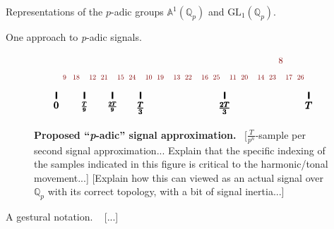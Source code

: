 \documentclass[letterpaper,11pt, reqno]{amsart}
\newtheorem{monodromy theorem}{Monodromy Theorem}[subsection]
\newtheorem{wild conjecture}[theorem]{Wild Conjecture}
\newtheorem{research objectives}{Research objectives}[subsection]
\newtheorem{research question}[theorem]{Research questions}
\newtheorem{aside question}[theorem]{Aside question}
\newtheorem{audio example}[theorem]{\loudspeaker[3] Example}
\newtheorem{blank remark}[theorem]{}
\newtheorem{terminology and comment}[theorem]{Terminology and comment}
\newtheorem{purity hypothesis}[theorem]{Purity hypothesis}
\newtheorem{corollary of the purity hypothesis}[theorem]{Corollary of the purity hypothesis}
\newcommand{\QQ} {{\mathbb Q}}
\numberwithin{equation}{theorem}
\begin{document}
\begin{section}{Representations of the $p$-adic groups $\mathbb{A}^{\!1}(\mathbb{Q}_{p})$ and $\text{GL}_{1}(\mathbb{Q}_{p})$.}
\begin{subsection}{One approach to {\em p}-adic signals.}
\begin{figure}[ht]
$$\begin{tikzpicture}
	\node[red!50!black!100] at (8,1.25) {\scalebox{.9}{$8$}};
	\node[red!50!black!100] at (1/3,.65) {\scalebox{.7}{$9\ $}};
	\node[red!50!black!100] at (2/3,.65) {\scalebox{.7}{$\ 18$}};
	\node[red!50!black!100] at (1+1/3,.65) {\scalebox{.7}{$12\ $}};
	\node[red!50!black!100] at (1+2/3,.65) {\scalebox{.7}{$\ 21$}};
	\node[red!50!black!100] at (2+1/3,.65) {\scalebox{.7}{$15\ $}};
	\node[red!50!black!100] at (2+2/3,.65) {\scalebox{.7}{$\ 24$}};
	\node[red!50!black!100] at (3+1/3,.65) {\scalebox{.7}{$10\ $}};
	\node[red!50!black!100] at (3+2/3,.65) {\scalebox{.7}{$\ 19$}};
	\node[red!50!black!100] at (4+1/3,.65) {\scalebox{.7}{$13\ $}};
	\node[red!50!black!100] at (4+2/3,.65) {\scalebox{.7}{$\ 22$}};
	\node[red!50!black!100] at (5+1/3,.65) {\scalebox{.7}{$16\ $}};
	\node[red!50!black!100] at (5+2/3,.65) {\scalebox{.7}{$\ 25$}};
	\node[red!50!black!100] at (6+1/3,.65) {\scalebox{.7}{$11\ $}};
	\node[red!50!black!100] at (6+2/3,.65) {\scalebox{.7}{$\ 20$}};
	\node[red!50!black!100] at (7+1/3,.65) {\scalebox{.7}{$14\ $}};
	\node[red!50!black!100] at (7+2/3,.65) {\scalebox{.7}{$\ 23$}};
	\node[red!50!black!100] at (8+1/3,.65) {\scalebox{.7}{$17\ $}};
	\node[red!50!black!100] at (8+2/3,.65) {\scalebox{.7}{$\ 26$}};
	\draw[black, ultra thick] (0,.125) -- (0,-.125);
	\draw[black, ultra thick] (1,.125) -- (1,-.125);
	\draw[black, ultra thick] (2,.125) -- (2,-.125);
	\draw[black, ultra thick] (3,.125) -- (3,-.125);
	\draw[black, ultra thick] (6,.125) -- (6,-.125);
	\draw[black, ultra thick] (9,.125) -- (9,-.125);
	\node[black] at (0,-.35) {\scalebox{1}{$\pmb{0}$}};
	\node[black] at (1,-.4) {\scalebox{.8}{$\pmb{\frac{T}{9}}$}};
	\node[black] at (2,-.4) {\scalebox{.8}{$\pmb{\frac{2T}{9}}$}};
	\node[black] at (3,-.45) {\scalebox{1}{$\pmb{\frac{T}{3}}$}};
	\node[black] at (6,-.45) {\scalebox{1}{$\pmb{\frac{2T}{3}}$}};
	\node[black] at (9,-.35) {\scalebox{1}{$\pmb{T}$}};
	\end{tikzpicture}
	$$
	\caption{{\bf Proposed ``{\em p}-adic'' signal approximation.}\ {\color{red} [$\frac{T}{p^n}$-sample per second signal approximation... Explain that the specific indexing of the samples indicated in this figure is critical to the harmonic/tonal movement...]} {\color{red} [Explain how this can viewed as an actual signal over $\QQ_{p}$ with its correct topology, with a bit of signal inertia...]}}
	\label{figure: p-adic signal proposal}
	\end{figure}

\end{subsection}

\begin{subsection}{A gestural notation.}
\ 
{\color{red} [...]}

\end{subsection}


\end{section}
\end{document}
